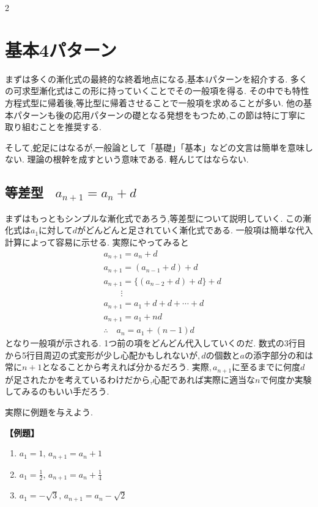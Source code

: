 \documentclass[dvipdfmx,a4paper,11pt,fleqn,openany]{jsbook}
\begin{document}
\begin{multicols*}{2}
  \section{基本4パターン}
    まずは多くの漸化式の最終的な終着地点になる,基本4パターンを紹介する.
    多くの可求型漸化式はこの形に持っていくことでその一般項を得る.
    その中でも特性方程式型に帰着後,等比型に帰着させることで一般項を求めることが多い.
    他の基本パターンも後の応用パターンの礎となる発想をもつため,この節は特に丁寧に取り組むことを推奨する.
    
    そして,蛇足にはなるが,一般論として「基礎」「基本」などの文言は簡単を意味しない.
    理論の根幹を成すという意味である.
    軽んじてはならない.

    \subsection{等差型 \, $a_{n+1}=a_n+d$}
      まずはもっともシンプルな漸化式であろう,等差型について説明していく.
      この漸化式は$a_1$に対して$d$がどんどんと足されていく漸化式である.
      一般項は簡単な代入計算によって容易に示せる.
      実際にやってみると
      \begin{align*}
        &a_{n+1}=a_n+d\\
        &a_{n+1}=(a_{n-1}+d)+d\\
        &a_{n+1}=\{(a_{n-2}+d)+d\}+d\\
        &\qquad \vdots\\
        &a_{n+1}=a_1+d+d+\cdots+d\\
        &a_{n+1}=a_1+nd\\
        &\therefore \quad a_n=a_1+(n-1)d
      \end{align*}
      となり一般項が示される.
      1つ前の項をどんどん代入していくのだ.
      数式の3行目から5行目周辺の式変形が少し心配かもしれないが,\,$d$の個数と$a$の添字部分の和は常に$n+1$となることから考えれば分かるだろう.
      実際,\,$a_{n+1}$に至るまでに何度$d$が足されたかを考えているわけだから,心配であれば実際に適当な$n$で何度か実験してみるのもいい手だろう.

      実際に例題を与えよう.

      \noindent \textbf{【例題】}
      \begin{enumerate}[label=(\arabic*),parsep=3pt]
        \item $\displaystyle a_1=1,\, a_{n+1}=a_n+1$
        \item $\displaystyle a_1=\frac{1}{2},\, a_{n+1}=a_n+\frac{1}{4}$
        \item $\displaystyle a_1=-\sqrt{3},\, a_{n+1}=a_n-\sqrt{2}$
      \end{enumerate}


\end{multicols*}
\end{document}
